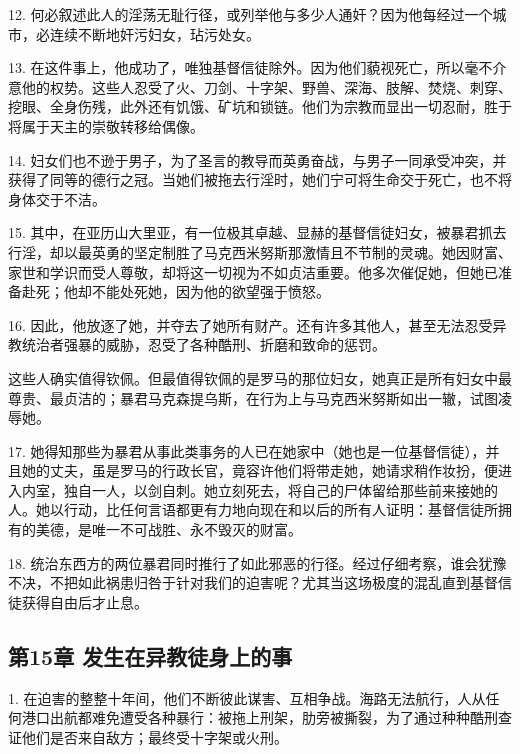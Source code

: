 12. 何必叙述此人的淫荡无耻行径，或列举他与多少人通奸？因为他每经过一个城市，必连续不断地奸污妇女，玷污处女。\par

13. 在这件事上，他成功了，唯独基督信徒除外。因为他们藐视死亡，所以毫不介意他的权势。这些人忍受了火、刀剑、十字架、野兽、深海、肢解、焚烧、刺穿、挖眼、全身伤残，此外还有饥饿、矿坑和锁链。他们为宗教而显出一切忍耐，胜于将属于天主的崇敬转移给偶像。\par

14. 妇女们也不逊于男子，为了圣言的教导而英勇奋战，与男子一同承受冲突，并获得了同等的德行之冠。当她们被拖去行淫时，她们宁可将生命交于死亡，也不将身体交于不洁。\par

15. 其中，在亚历山大里亚，有一位极其卓越、显赫的基督信徒妇女，被暴君抓去行淫，却以最英勇的坚定制胜了马克西米努斯那激情且不节制的灵魂。她因财富、家世和学识而受人尊敬，却将这一切视为不如贞洁重要。他多次催促她，但她已准备赴死；他却不能处死她，因为他的欲望强于愤怒。\par

16. 因此，他放逐了她，并夺去了她所有财产。还有许多其他人，甚至无法忍受异教统治者强暴的威胁，忍受了各种酷刑、折磨和致命的惩罚。\par

这些人确实值得钦佩。但最值得钦佩的是罗马的那位妇女，她真正是所有妇女中最尊贵、最贞洁的；暴君马克森提乌斯，在行为上与马克西米努斯如出一辙，试图凌辱她。\par

17. 她得知那些为暴君从事此类事务的人已在她家中（她也是一位基督信徒），并且她的丈夫，虽是罗马的行政长官，竟容许他们将带走她，她请求稍作妆扮，便进入内室，独自一人，以剑自刺。她立刻死去，将自己的尸体留给那些前来接她的人。她以行动，比任何言语都更有力地向现在和以后的所有人证明：基督信徒所拥有的美德，是唯一不可战胜、永不毁灭的财富。\par

18. 统治东西方的两位暴君同时推行了如此邪恶的行径。经过仔细考察，谁会犹豫不决，不把如此祸患归咎于针对我们的迫害呢？尤其当这场极度的混乱直到基督信徒获得自由后才止息。\par


\subsection{第15章 发生在异教徒身上的事}

1. 在迫害的整整十年间，他们不断彼此谋害、互相争战。海路无法航行，人从任何港口出航都难免遭受各种暴行：被拖上刑架，肋旁被撕裂，为了通过种种酷刑查证他们是否来自敌方；最终受十字架或火刑。\par

